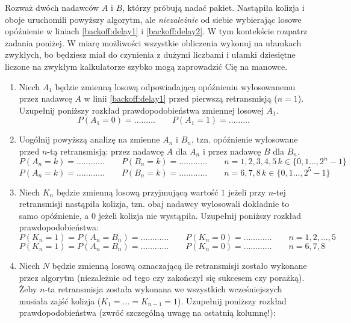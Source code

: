 \documentclass[twoside]{mwart}
\newcommand{\ans}[1]{}
\newcommand{\ans}[1]{\par\emph{Odpowiedź:} #1}
\begin{document}
Rozważ dwóch nadawców $A$ i $B$, którzy próbują nadać pakiet.
Nastąpiła kolizja i oboje uruchomili powyższy algorytm, ale \emph{niezależnie} od siebie wybierając losowe opóźnienie w liniach \ref{backoff:delay1} i \ref{backoff:delay2}.
W tym kontekście rozpatrz zadania poniżej.
W miarę możliwości wszystkie obliczenia wykonuj na ułamkach zwykłych, bo będziesz miał do czynienia z dużymi liczbami i ułamki dziesiętne liczone na zwykłym kalkulatorze szybko mogą zaprowadzić Cię na manowce.
\begin{enumerate}
\item Niech $A_1$ będzie zmienną losową odpowiadającą opóźnieniu wylosowanemu przez nadawcę $A$ w linii \ref{backoff:delay1} przed pierwszą retransmisją ($n=1$).
Uzupełnij poniższy rozkład prawdopodobieństwa zmiennej losowej $A_1$.
\[ P(A_1=0)=\ldots\ldots\ldots \qquad P(A_1=1)=\ldots\ldots\ldots \]
\ans{\[P(A_1=0)=P(A_1=1)=\frac{1}{2}\]}
\item Uogólnij powyższą analizę na zmienne $A_n$ i $B_n$, tzn. opóźnienie wylosowane przed $n$-tą retransmisją: przez nadawcę $A$ dla $A_n$ i przez nadawcę $B$ dla $B_n$.
\[ P(A_n=k)=\ldots\ldots\ldots\ldots \qquad P(B_n=k)=\ldots\ldots\ldots\ldots \qquad n=1, 2, 3, 4, 5\, k\in\{0, 1 \ldots, 2^n-1\} \]
\[ P(A_n=k)=\ldots\ldots\ldots\ldots \qquad P(B_n=k)=\ldots\ldots\ldots\ldots \qquad n=6, 7, 8\, k\in\{0, 1 \ldots, 2^5-1\} \]
\ans{
	\[P(A_n=k)=P(B_n=k)=\frac{1}{2^n} \quad n\leq 5 \]
	\[P(A_n=k)=P(B_n=k)=\frac{1}{2^5} \quad n> 5 \]
}
\item Niech $K_n$ będzie zmienną losową przyjmującą wartość $1$ jeżeli przy $n$-tej retransmisji nastąpiła kolizja, tzn. obaj nadawcy wylosowali dokładnie to samo opóźnienie, a $0$ jeżeli kolizja nie wystąpiła.
Uzupełnij poniższy rozkład prawdopodobieństwa:
\[ P(K_n=1)=P(A_n=B_n)=\ldots\ldots\ldots\ldots \qquad P(K_n=0)=\ldots\ldots\ldots\ldots \qquad n=1, 2, \ldots, 5\]
\[ P(K_n=1)=P(A_n=B_n)=\ldots\ldots\ldots\ldots \qquad P(K_n=0)=\ldots\ldots\ldots\ldots \qquad n=6, 7, 8\]
\ans{
	\[ P(K_n=1)=P(A_n=B_n) = \sum_{k=0}^{2^n-1} P(A_n=k, B_n=k) = \sum_{k=0}^{2^n-1} P(A_n=k) P(B_n=k) = \frac{1}{2^n} \]
}
\item Niech $N$ będzie zmienną losową oznaczającą ile retransmisji zostało wykonane przez algorytm (niezależnie od tego czy zakończył się sukcesem czy porażką).
Żeby $n$-ta retransmisja została wykonana we wszystkich wcześniejszych musiała zajść kolizja ($K_1=\ldots=K_{n-1}=1$).
Uzupełnij poniższy rozkład prawdopodobieństwa (zwróć szczególną uwagę na ostatnią kolumnę!):\\

\end{enumerate}
\end{document}
